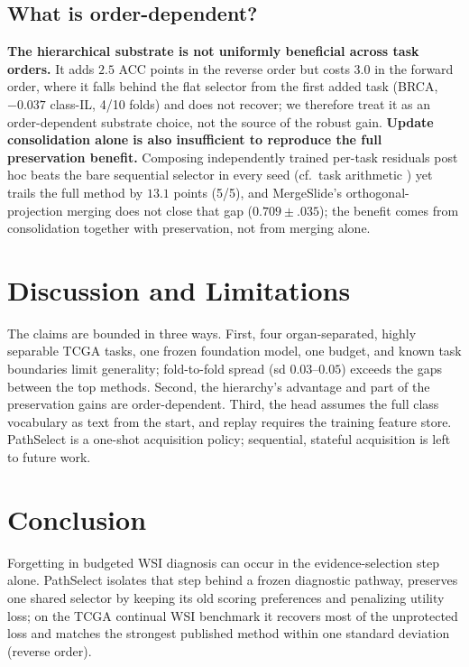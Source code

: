 \documentclass{article}
\begin{document}
\subsection{What is order-dependent?}
\label{ssec:order}

\textbf{The hierarchical substrate is not uniformly beneficial across task orders.} It adds $2.5$ ACC points in the reverse order but costs $3.0$ in the forward order, where it falls behind the flat selector from the first added task (BRCA, $-0.037$ class-IL, 4/10 folds) and does not recover; we therefore treat it as an order-dependent substrate choice, not the source of the robust gain. \textbf{Update consolidation alone is also insufficient to reproduce the full preservation benefit.} Composing independently trained per-task residuals post hoc beats the bare sequential selector in every seed (cf.\ task arithmetic \cite{ilharco2023task}) yet trails the full method by $13.1$ points (5/5), and MergeSlide's orthogonal-projection merging \cite{bui2026mergeslide} does not close that gap ($0.709{\pm}.035$); the benefit comes from consolidation together with preservation, not from merging alone.

\FloatBarrier
\section{Discussion and Limitations}
\label{sec:discussion}



The claims are bounded in three ways. First, four organ-separated, highly separable TCGA tasks, one frozen foundation model, one budget, and known task boundaries limit generality; fold-to-fold spread (sd $0.03$--$0.05$) exceeds the gaps between the top methods. Second, the hierarchy's advantage and part of the preservation gains are order-dependent. Third, the head assumes the full class vocabulary as text from the start, and replay requires the training feature store. PathSelect is a one-shot acquisition policy; sequential, stateful acquisition is left to future work.

\section{Conclusion}

Forgetting in budgeted WSI diagnosis can occur in the evidence-selection step alone. PathSelect isolates that step behind a frozen diagnostic pathway, preserves one shared selector by keeping its old scoring preferences and penalizing utility loss; on the TCGA continual WSI benchmark it recovers most of the unprotected loss and matches the strongest published method within one standard deviation (reverse order).
\end{document}
